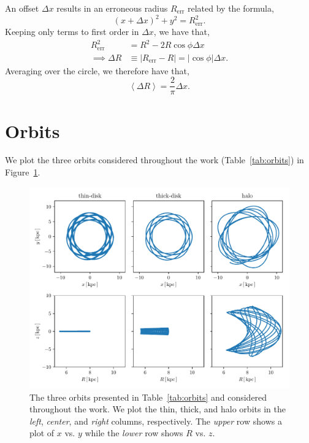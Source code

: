 \documentclass[twocolumn]{aastex62}
\newcommand{\abs}[1]{\left| #1 \right|}
\newcommand{\avg}[1]{\left< #1 \right>}
\newcommand{\beq}{\begin{equation}}
\newcommand{\eeq}{\end{equation}}
\begin{document}
An offset $\Delta x$ results in an erroneous radius $R_{\text{err}}$ related by
the formula,
\beq
(x+\Delta x)^2 + y^2 = R_{\text{err}}^2\text{.}
\eeq
Keeping only terms to first order in $\Delta x$, we have that,
\beq
\begin{split}
R_{\text{err}}^2 &= R^2 - 2 R \cos{\phi} \Delta x \\
\implies \Delta R &\equiv \abs{R_{\text{err}} - R} 
        = \abs{\cos{\phi}} \Delta x\text{.}
\end{split}
\eeq
Averaging over the circle, we therefore have that,
\beq
\avg{\Delta R} = \frac{2}{\pi} \Delta x\text{.}
\eeq

\section{Orbits} \label{app:orbits}
We plot the three orbits considered throughout the work
(Table~\ref{tab:orbits}) in Figure~\ref{fig:plot_orbits}.

\begin{figure}
\begin{center}
\includegraphics[width=\textwidth]{fig/orbits.pdf}
\end{center}
\caption{The three orbits presented in Table~\ref{tab:orbits} and considered
throughout the work. We plot the thin, thick, and halo orbits in the {\em
left}, {\em center}, and {\em right} columns, respectively. The {\em upper}
row shows a plot of $x$ vs. $y$ while the {\em lower} row shows $R$ vs. $z$.}
\label{fig:plot_orbits}
\end{figure}
\end{document}

